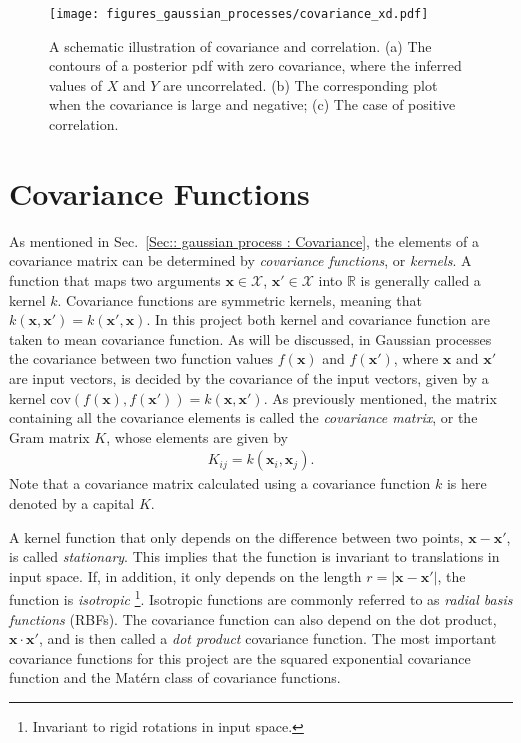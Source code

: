 \documentclass[twoside,english]{uiofysmaster}
\begin{document}
\begin{figure}
\centering
\texttt{[image: figures\_gaussian\_processes/covariance\_xd.pdf]}
\caption{A schematic illustration of covariance and correlation. (a) The contours of a posterior pdf with zero covariance, where the inferred values of $X$ and $Y$ are uncorrelated. (b) The corresponding plot when the covariance is large and negative; (c) The case of positive correlation.}
\label{Fig:: gaussian process : Covariance illustrated}
\end{figure}


\section{Covariance Functions}\label{Sec:: gaussian processes : Covariance functions}


As mentioned in Sec.~\ref{Sec:: gaussian process : Covariance}, the elements of a covariance matrix can be determined by \textit{covariance functions}, or \textit{kernels}. A function that maps two arguments $\textbf{x} \in \mathcal{X}$, $\textbf{x}' \in \mathcal{X}$ into $\mathbb{R}$ is generally called a kernel $k$. Covariance functions are symmetric kernels, meaning that $k(\textbf{x}, \textbf{x}') = k(\textbf{x}', \textbf{x})$. In this project both kernel and covariance function are taken to mean covariance function. As will be discussed, in Gaussian processes the covariance between two function values $f(\textbf{x})$ and $f(\textbf{x}')$, where $\textbf{x}$ and $\textbf{x}'$ are input vectors, is decided by the covariance of the input vectors, given by a kernel $\text{cov}(f(\textbf{x}), f(\textbf{x}')) = k(\textbf{x}, \textbf{x}')$. As previously mentioned, the matrix containing all the covariance elements is called the \textit{covariance matrix}, or the Gram matrix $K$, whose elements are given by
\begin{align}\label{Eq:: covariance matrix}
K_{ij} = k(\textbf{x}_i, \textbf{x}_j).
\end{align}
Note that a covariance matrix calculated using a covariance function $k$ is here denoted by a capital $K$.

A kernel function that only depends on the difference between two points, $\textbf{x}-\textbf{x}'$, is called \textit{stationary}. This implies that the function is invariant to translations in input space. If, in addition, it only depends on the length $r=|\textbf{x}-\textbf{x}'|$, the function is \textit{isotropic} \footnote{Invariant to rigid rotations in input space.}.  Isotropic functions are commonly referred to as \textit{radial basis functions} (RBFs). The covariance function can also depend on the dot product, $\textbf{x} \cdot \textbf{x}'$, and is then called a \textit{dot product} covariance function. The most important covariance functions for this project are the squared exponential covariance function and the Mat\'{e}rn class of covariance functions.
\end{document}
